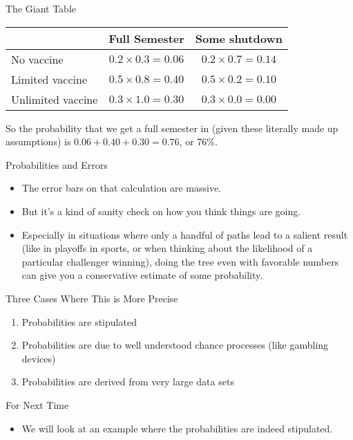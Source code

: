 \documentclass[
  ignorenonframetext,
]{beamer}
\providecommand{\tightlist}{%
  \setlength{\itemsep}{0pt}\setlength{\parskip}{0pt}}
\begin{document}
\begin{frame}{The Giant Table}
\protect\hypertarget{the-giant-table}{}
\begin{longtable}[]{@{}lcc@{}}
\toprule
& Full Semester & Some shutdown \\
\midrule
\endhead
No vaccine & \(0.2 \times 0.3 = 0.06\) & \(0.2 \times 0.7 = 0.14\) \\
Limited vaccine & \(0.5 \times 0.8 = 0.40\) &
\(0.5 \times 0.2 = 0.10\) \\
Unlimited vaccine & \(0.3 \times 1.0 = 0.30\) &
\(0.3 \times 0.0 = 0.00\) \\
\bottomrule
\end{longtable}

So the probability that we get a full semester in (given these literally
made up assumptions) is \(0.06 + 0.40 + 0.30 = 0.76\), or 76\%.
\end{frame}

\begin{frame}{Probabilities and Errors}
\protect\hypertarget{probabilities-and-errors}{}
\begin{itemize}
\tightlist
\item
  The error bars on that calculation are massive.
\item
  But it's a kind of sanity check on how you think things are going.
\item
  Especially in situations where only a handful of paths lead to a
  salient result (like in playoffs in sports, or when thinking about the
  likelihood of a particular challenger winning), doing the tree even
  with favorable numbers can give you a conservative estimate of some
  probability.
\end{itemize}
\end{frame}

\begin{frame}{Three Cases Where This is More Precise}
\protect\hypertarget{three-cases-where-this-is-more-precise}{}
\begin{enumerate}
\tightlist
\item
  Probabilities are stipulated
\item
  Probabilities are due to well understood chance processes (like
  gambling devices)
\item
  Probabilities are derived from very large data sets
\end{enumerate}
\end{frame}

\begin{frame}{For Next Time}
\protect\hypertarget{for-next-time}{}
\begin{itemize}
\tightlist
\item
  We will look at an example where the probabilities are indeed
  stipulated.
\end{itemize}
\end{frame}
\end{document}
